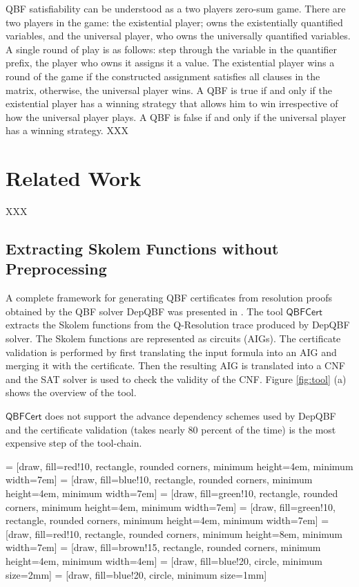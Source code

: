 \documentclass[runningheads]{llncs}
\newcommand{\qrpcert}{\mathsf{QBFCert}}
\newcommand{\0}{0}
\newcommand{\1}{1}
\begin{document}
QBF satisfiability can be understood as a two players zero-sum game. There are two players in the game: the existential player; owns the existentially quantified variables, and the universal player, who owns the universally quantified variables. A single round of play is as follows: step through the variable in the quantifier prefix, the player who owns it assigns it a value. The existential player wins a round of the game if the constructed assignment satisfies all clauses in the matrix, otherwise, the universal player wins. A QBF is true if and only if the existential player has a winning strategy that allows him to win irrespective of how the universal player plays. A QBF is false if and only if the universal player has a winning strategy. 
XXX
\section{Related Work} \label{sec:related-work}
XXX
\subsection{Extracting Skolem Functions without Preprocessing} \label{subsec:skolem-nopre}
A complete framework for generating QBF certificates from resolution proofs obtained by the QBF solver DepQBF was presented in \cite{NiemetzPLSB12}. The tool $\qrpcert$ extracts the Skolem functions \cite{BalabanovJ11} from the Q-Resolution trace produced by DepQBF solver. The Skolem functions are represented as circuits (AIGs). The certificate validation is performed by first translating the input formula into an AIG  and merging it with the certificate. Then the resulting AIG is translated into a CNF and the SAT solver is used to check the validity of the CNF. Figure \ref{fig:tool} (a) shows the overview of the tool. 

$\qrpcert$ does not support the advance dependency schemes used by DepQBF and the certificate validation (takes nearly 80 percent of the time) is the most expensive step of the tool-chain.  
 
 = [draw, fill=red!10, rectangle, rounded corners,
minimum height=4em, minimum width=7em]
 = [draw, fill=blue!10, rectangle, rounded corners,
minimum height=4em, minimum width=7em]
 = [draw, fill=green!10, rectangle, rounded corners,
minimum height=4em, minimum width=7em]
 = [draw, fill=green!10, rectangle, rounded corners,
minimum height=4em, minimum width=7em]
 = [draw, fill=red!10, rectangle, rounded corners,
minimum height=8em, minimum width=7em]
 = [draw, fill=brown!15, rectangle, rounded corners,
minimum height=4em, minimum width=4em]
 = [draw, fill=blue!20, circle, minimum size=2mm]
 = [draw, fill=blue!20, circle, minimum size=1mm]
\end{document}
